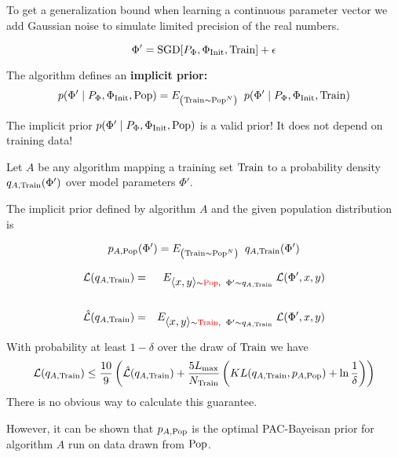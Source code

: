 {To get a generalization bound when learning a continuous parameter vector we add Gaussian noise to simulate limited precision of the real numbers.

$$\Phi' = \mathrm{SGD}\!\left[P_\Phi,\Phi_{\mathrm{Init}},\mathrm{Train}\right] + \epsilon$$

\vfill
The algorithm defines an {\bf implicit prior:}
$$p\!\left(\Phi'\;|\;P_\Phi,\Phi_{\mathrm{Init}},\mathrm{Pop}\right) = E_{\left(\mathrm{Train} \sim \mathrm{Pop}^N\right)}\;\;p\!\left(\Phi'\;|\;P_\Phi,\Phi_{\mathrm{Init}},\mathrm{Train}\right)$$

\vfill
The implicit prior $p\!\left(\Phi'\;|\;P_\Phi,\Phi_{\mathrm{Init}},\mathrm{Pop}\right)$ is a valid prior!  It does not depend on training data!


Let $A$ be any algorithm mapping a training set $\mathrm{Train}$ to a probability density $q_{A,\mathrm{Train}}(\Phi')$ over model parameters $\Phi'$.

\vfill
The implicit prior defined by algorithm $A$ and the given population distribution is

$$p_{A,\mathrm{Pop}}(\Phi') = E_{\left(\mathrm{Train} \sim \mathrm{Pop}^{N}\right)} \;\;q_{A,\mathrm{Train}}(\Phi')$$


\begin{eqnarray*}
{\cal L}(q_{A,\mathrm{Train}}) & = & E_{{\mbox{$\langle x,y\rangle$}} \sim {\color{red}  \mathrm{Pop}}, \;\;\Phi' \sim q_{A,\mathrm{Train}}}\;{\cal L}(\Phi',x,y) \\
\\
\hat{\cal L}(q_{A,\mathrm{Train}}) & = & E_{{\mbox{$\langle x,y\rangle$}} \sim {\color{red} \mathrm{Train}}, \;\;\Phi' \sim q_{A,\mathrm{Train}}}\;{\cal L}(\Phi',x,y)
\end{eqnarray*}


With probability at least $1-\delta$ over the draw of $\mathrm{Train}$ we have
\vfill
{\huge
$${\cal L}(q_{A,\mathrm{Train}}) \leq \frac{10}{9}\left( \hat{\cal L}(q_{A,\mathrm{Train}}) + \frac{5L_{\max}}{N_\mathrm{Train}}\left(KL(q_{A,\mathrm{Train}},p_{A,\mathrm{Pop}})+ \ln\frac{1}{\delta}\right)\right)$$
}
\vfill
There is no obvious way to calculate this guarantee.

\vfill
However, it can be shown that $p_{A,\mathrm{Pop}}$ is the optimal PAC-Bayeisan prior for algorithm $A$ run on data drawn from $\mathrm{Pop}$.


}

